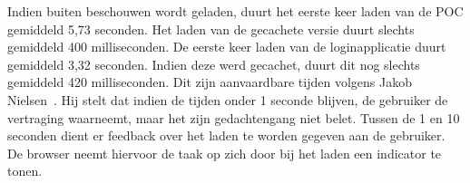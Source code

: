 
Indien \st{} buiten beschouwen wordt geladen, duurt het eerste keer laden van de POC gemiddeld 5,73 seconden. 
Het laden van de gecachete versie duurt slechts gemiddeld 400 milliseconden.
De eerste keer laden van de loginapplicatie duurt gemiddeld 3,32 seconden.
Indien deze werd gecachet, duurt dit nog slechts gemiddeld 420 milliseconden.
Dit zijn aanvaardbare tijden volgens Jakob Nielsen~\cite{Nielsen1993}.
Hij stelt dat indien de tijden onder 1 seconde blijven, de gebruiker de vertraging waarneemt, maar het zijn gedachtengang niet belet.
Tussen de 1 en 10 seconden dient er feedback over het laden te worden gegeven aan de gebruiker.
De browser neemt hiervoor de taak op zich door bij het laden een indicator te tonen.






